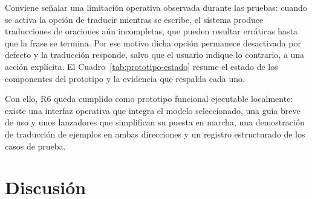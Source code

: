 \documentclass[12pt,a4paper,oneside]{book}
\begin{document}
Conviene señalar una limitación operativa observada durante las pruebas: cuando se activa la opción de traducir mientras se escribe, el sistema produce traducciones de oraciones aún incompletas, que pueden resultar erráticas hasta que la frase se termina. Por ese motivo dicha opción permanece desactivada por defecto y la traducción responde, salvo que el usuario indique lo contrario, a una acción explícita. El Cuadro~\ref{tab:prototipo-estado} resume el estado de los componentes del prototipo y la evidencia que respalda cada uno.

\begin{table}[h]
\centering
\caption{Estado de los componentes del prototipo funcional.}
\label{tab:prototipo-estado}
\end{table}

Con ello, R6 queda cumplido como prototipo funcional ejecutable localmente: existe una interfaz operativa que integra el modelo seleccionado, una guía breve de uso y unos lanzadores que simplifican su puesta en marcha, una demostración de traducción de ejemplos en ambas direcciones y un registro estructurado de los casos de prueba.

\section{Discusión}\label{prototipo-discusion}
\end{document}
